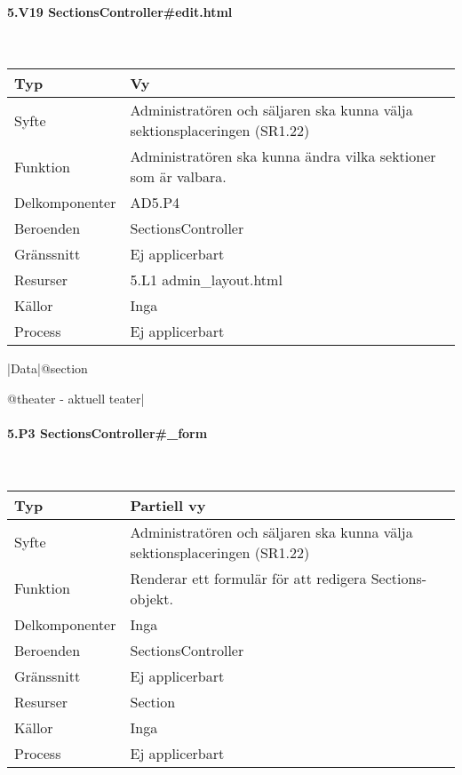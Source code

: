\documentclass[a4paper, twoside, 11pt, titlepage]{article}
\begin{document}
			\paragraph{5.V19 SectionsController\#edit.html}\

			\begin {table} [ht] \begin{tabular} {  p{3.5cm} p{9.6cm} }
				\hline
				Typ & Vy  \\
				\hline
				Syfte & Administratören och säljaren ska kunna välja sektionsplaceringen (SR1.22)  \\
				\hline
				Funktion & Administratören ska kunna ändra vilka sektioner som är valbara.  \\
				\hline
				Delkomponenter & AD5.P4  \\
				\hline
				Beroenden & SectionsController  \\
				\hline
				Gränssnitt & Ej applicerbart  \\
				\hline
				Resurser & 5.L1 admin\_layout.html  \\
				\hline
				Källor & Inga  \\
				\hline
				Process & Ej applicerbart  \\
				\hline
			\end{tabular} \end{table} \FloatBarrier
			\vspace{6mm}

			|Data|@section

			@theater - aktuell teater|

			\paragraph{5.P3 SectionsController\#\_form}\

			\begin {table} [ht] \begin{tabular} {  p{3.5cm} p{9.6cm} }
				\hline
				Typ & Partiell vy  \\
				\hline
				Syfte & Administratören och säljaren ska kunna välja sektionsplaceringen (SR1.22)  \\
				\hline
				Funktion & Renderar ett formulär för att redigera Sections-objekt.  \\
				\hline
				Delkomponenter & Inga  \\
				\hline
				Beroenden & SectionsController  \\
				\hline
				Gränssnitt & Ej applicerbart  \\
				\hline
				Resurser & Section  \\
				\hline
				Källor & Inga  \\
				\hline
				Process & Ej applicerbart  \\
				\hline
			\end{tabular} \end{table} \FloatBarrier
			\vspace{6mm}
\end{document}
